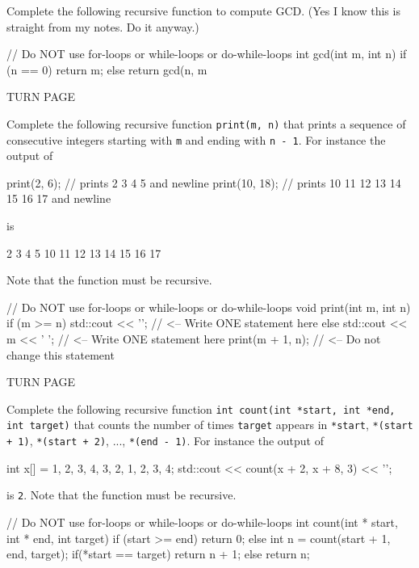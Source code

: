 

\nextq
Complete the following recursive function to compute GCD.
(Yes I know this is straight from my notes. Do it anyway.)
\\
\ANSWER
\begin{answercode}
// Do NOT use for-loops or while-loops or do-while-loops
int gcd(int m, int n)
{
  if (n == 0)
  {
    return m;
  }
  else
  {
    return gcd(n, m %
  }
}
\end{answercode}

TURN PAGE

\newpage
\nextq
Complete the following recursive function
\verb!print(m, n)! that prints a sequence
of consecutive integers starting with \verb!m!
and ending with \verb!n - 1!.
For instance the output of
\begin{console}[fontsize=\small]
print(2, 6);   // prints 2 3 4 5 and newline
print(10, 18); // prints 10 11 12 13 14 15 16 17 and newline
\end{console}
is
\begin{console}[fontsize=\small]
2 3 4 5
10 11 12 13 14 15 16 17
\end{console}
Note that the function must be recursive.
\\
\ANSWER
\begin{answercode}
// Do NOT use for-loops or while-loops or do-while-loops
void print(int m, int n)
{
    if (m >= n)
    {
        std::cout << '\n';       // <-- Write ONE statement here
    }
    else
    {
        std::cout << m << ' ';   // <-- Write ONE statement here
        print(m + 1, n);         // <-- Do not change this statement
    }
}
\end{answercode}

TURN PAGE

\newpage
\nextq
Complete the following recursive function
\texttt{int count(int *start, int *end, int target)}
that counts the number of times \verb!target!
appears in
\verb!*start!, \verb!*(start + 1)!, \verb!*(start + 2)!,
..., \verb!*(end - 1)!.
For instance the output of
\begin{console}[fontsize=\small]
int x[] = {1, 2, 3, 4, 3, 2, 1, 2, 3, 4};
std::cout << count(x + 2, x + 8, 3) << '\n';
\end{console}
is \verb!2!.
Note that the function must be recursive.
\\
\ANSWER
\begin{answercode}
// Do NOT use for-loops or while-loops or do-while-loops
int count(int * start, int * end, int target)
{
    if (start >= end)
    {
        return 0;
    }
    else
    {
      int n = count(start + 1, end, target);
      if(*start == target)
      {
        return n + 1;
      }
      else
      {
        return n;
      }
    }
}
\end{answercode}


